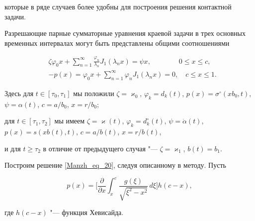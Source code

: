 которые в ряде случаев более удобны для построения решения контактной задачи.



\smallskip




Разрешающие парные сумматорные уравнения краевой задачи в трех основных временных интервалах  могут быть представлены общими соотношениями

\begin{equation}\label{Manzh_eq_20}%

\begin{aligned}

  &

  \zeta\varphi_0x+\sum_{n=1}^\infty\frac{\varphi_n}{\lambda_n}J_1(\lambda_nx)=\psi x, \qquad \qquad 

  0\leq x\leq c,

\\

  &

  -p(x)=\varphi_0x+\sum_{n=1}^\infty\varphi_nJ_1(\lambda_nx)=0,\quad

  c\leq x\leq1.

\end{aligned}

\end{equation}

Здесь для $t\in[\tau_0,\tau_1]$ мы положили $\zeta=\varkappa_0$, $\varphi_k=d_k(t)$, $p(x)=\sigma^\circ(xb_0,t)$, $\psi=\alpha(t)$, $c=a/b_0$, $x=r/b_0$;

для $t\in[\tau_1,\tau_2]$  мы имеем  $\zeta=\varkappa(t)$, $\varphi_k=d_k^\circ(t)$, $\psi=\dot\alpha(t)$, $p(x)=s(xb(t),t)$, $c=a/b(t)$, $x=r/b(t)$,  

и для $t\geq\tau_2$ в отличие от предыдущего случая "--- $\zeta=\varkappa_1$, $b(t)=b_1$.



Построим решение \eqref{Manzh_eq_20}, следуя описанному в \cite{Manzh_bib_11} методу. Пусть

\begin{equation}\label{Manzh_eq_21}%

  p(x)=\bigg[\frac{\partial}{\partial x}\int_x^c\frac{g(\xi)}{\sqrt{\xi^2-x^2}}\,d\xi\bigg]h(c-x),

\end{equation}

где $h(c-x)$ "--- функция Хевисайда.



